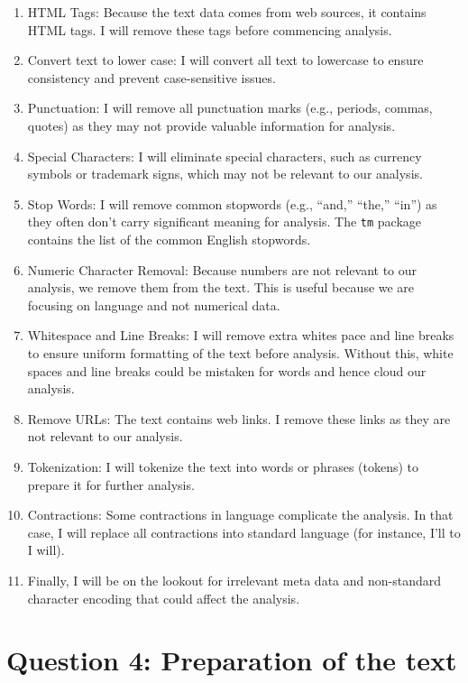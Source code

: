 \documentclass[
]{article}
\begin{document}
\begin{enumerate}
\def\labelenumi{\arabic{enumi}.}
\item
  HTML Tags: Because the text data comes from web sources, it contains
  HTML tags. I will remove these tags before commencing analysis.
\item
  Convert text to lower case: I will convert all text to lowercase to
  ensure consistency and prevent case-sensitive issues.
\item
  Punctuation: I will remove all punctuation marks (e.g., periods,
  commas, quotes) as they may not provide valuable information for
  analysis.
\item
  Special Characters: I will eliminate special characters, such as
  currency symbols or trademark signs, which may not be relevant to our
  analysis.
\item
  Stop Words: I will remove common stopwords (e.g., ``and,'' ``the,''
  ``in'') as they often don't carry significant meaning for analysis.
  The \texttt{tm} package contains the list of the common English
  stopwords.
\item
  Numeric Character Removal: Because numbers are not relevant to our
  analysis, we remove them from the text. This is useful because we are
  focusing on language and not numerical data.
\item
  Whitespace and Line Breaks: I will remove extra whites pace and line
  breaks to ensure uniform formatting of the text before analysis.
  Without this, white spaces and line breaks could be mistaken for words
  and hence cloud our analysis.
\item
  Remove URLs: The text contains web links. I remove these links as they
  are not relevant to our analysis.
\item
  Tokenization: I will tokenize the text into words or phrases (tokens)
  to prepare it for further analysis.
\item
  Contractions: Some contractions in language complicate the analysis.
  In that case, I will replace all contractions into standard language
  (for instance, I'll to I will).
\item
  Finally, I will be on the lookout for irrelevant meta data and
  non-standard character encoding that could affect the analysis.
\end{enumerate}

\hypertarget{question-4-preparation-of-the-text}{%
\section{\texorpdfstring{\textbf{Question 4: Preparation of the
text}}{Question 4: Preparation of the text}}\label{question-4-preparation-of-the-text}}
\end{document}
